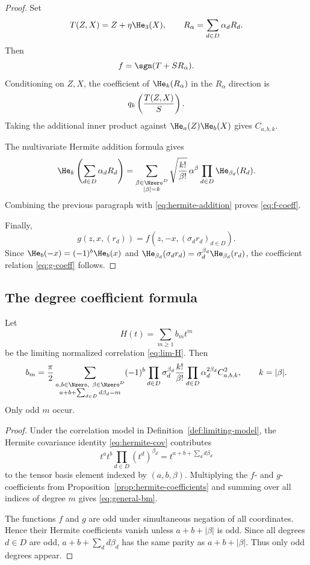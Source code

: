 \begin{proof}
Set
\[
  T(Z,X)=Z+\eta \He_3(X),
  \qquad
  R_\alpha=\sum_{d\in D}\alpha_dR_d.
\]
Then
\[
  f=\sgn(T+SR_\alpha).
\]
Conditioning on $Z,X$, the coefficient of $\He_k(R_\alpha)$ in the $R_\alpha$ direction is
\[
  q_k\left({T(Z,X)\over S}\right).
\]
Taking the additional inner product against $\He_a(Z)\He_b(X)$ gives $C_{a,b,k}$.

The multivariate Hermite addition formula gives
\begin{equation}\label{eq:hermite-addition}
  \He_k\left(\sum_{d\in D}\alpha_dR_d\right)
  =\sum_{\substack{\beta\in\Nzero^D\\ |\beta|=k}}
  \sqrt{k!\over \beta!}\,\alpha^\beta
  \prod_{d\in D}\He_{\beta_d}(R_d).
\end{equation}
Combining the previous paragraph with \eqref{eq:hermite-addition} proves \eqref{eq:f-coeff}.

Finally,
\[
  g(z,x,(r_d))=f(z,-x,(\sigma_dr_d)_{d\in D}).
\]
Since $\He_b(-x)=(-1)^b\He_b(x)$ and $\He_{\beta_d}(\sigma_dr_d)=\sigma_d^{\beta_d}\He_{\beta_d}(r_d)$, the coefficient relation \eqref{eq:g-coeff} follows.
\end{proof}

\subsection{The degree coefficient formula}\label{subsec:degree-formula}

\begin{theorem}\label{thm:coefficient-formula}
Let
\[
  H(t)=\sum_{m\ge1}b_m t^m
\]
be the limiting normalized correlation \eqref{eq:lim-H}.  Then
\begin{equation}\label{eq:general-bm}
  b_m={\pi\over2}
  \sum_{\substack{a,b\in\Nzero,\ \beta\in\Nzero^D\\ a+b+\sum_{d\in D}d\beta_d=m}}
  (-1)^b\prod_{d\in D}\sigma_d^{\beta_d}
  {k!\over \beta!}
  \prod_{d\in D}\alpha_d^{2\beta_d}
  C_{a,b,k}^2,
  \qquad k=|\beta|.
\end{equation}
Only odd $m$ occur.
\end{theorem}

\begin{proof}
Under the correlation model in Definition~\ref{def:limiting-model}, the Hermite covariance identity \eqref{eq:hermite-cov} contributes
\[
  t^a t^b\prod_{d\in D}(t^d)^{\beta_d}
  =t^{a+b+\sum_d d\beta_d}
\]
to the tensor basis element indexed by $(a,b,\beta)$.  Multiplying the $f$- and $g$-coefficients from Proposition~\ref{prop:hermite-coefficients} and summing over all indices of degree $m$ gives \eqref{eq:general-bm}.

The functions $f$ and $g$ are odd under simultaneous negation of all coordinates.  Hence their Hermite coefficients vanish unless $a+b+|\beta|$ is odd.  Since all degrees $d\in D$ are odd, $a+b+\sum_d d\beta_d$ has the same parity as $a+b+|\beta|$.  Thus only odd degrees appear.
\end{proof}

